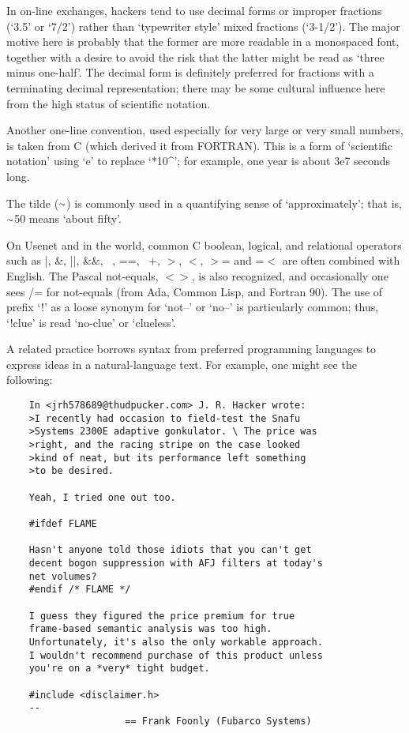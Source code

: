 In on-line exchanges, hackers tend to use decimal forms or improper fractions
(`3.5' or `7/2') rather than `typewriter style' mixed fractions (`3-1/2'). The
major motive here is probably that the former are more readable in a monospaced
font, together with a desire to avoid the risk that the latter might be read as
`three minus one-half'. The decimal form is definitely preferred for fractions
with a terminating decimal representation; there may be some cultural influence
here from the high status of scientific notation.

Another one-line convention, used especially for very large or very small
numbers, is taken from C (which derived it from FORTRAN). This is a form of
`scientific notation' using `e' to replace `*10\^{}'; for example, one year is
about 3e7 seconds long.

The tilde ($\Tilde$) is commonly used in a quantifying sense of
`approximately'; that is, $\Tilde$50 means `about fifty'.

On Usenet and in the  world, common C boolean, logical, and
relational operators such as |, \&, ||, \&\&, ~, ==, ~+, $>$, $<$, $>$= and
=$<$ are often combined with English. The Pascal not-equals, $<$$>$, is also
recognized, and occasionally one sees /= for not-equals (from Ada, Common Lisp,
and Fortran 90). The use of prefix `!' as a loose synonym for `not--' or `no--'
is particularly common; thus, `!clue' is read `no-clue' or `clueless'.

A related practice borrows syntax from preferred programming languages to
express ideas in a natural-language text. For example, one might see the
following:

\begin{verbatim}
	In <jrh578689@thudpucker.com> J. R. Hacker wrote:
	>I recently had occasion to field-test the Snafu
	>Systems 2300E adaptive gonkulator. \ The price was
	>right, and the racing stripe on the case looked
	>kind of neat, but its performance left something
	>to be desired.

	Yeah, I tried one out too.
	
	#ifdef FLAME

	Hasn't anyone told those idiots that you can't get
	decent bogon suppression with AFJ filters at today's
	net volumes?
	#endif /* FLAME */

	I guess they figured the price premium for true
	frame-based semantic analysis was too high.
	Unfortunately, it's also the only workable approach.
	I wouldn't recommend purchase of this product unless
	you're on a *very* tight budget.

	#include <disclaimer.h>
	--
	                 == Frank Foonly (Fubarco Systems)
\end{verbatim}

